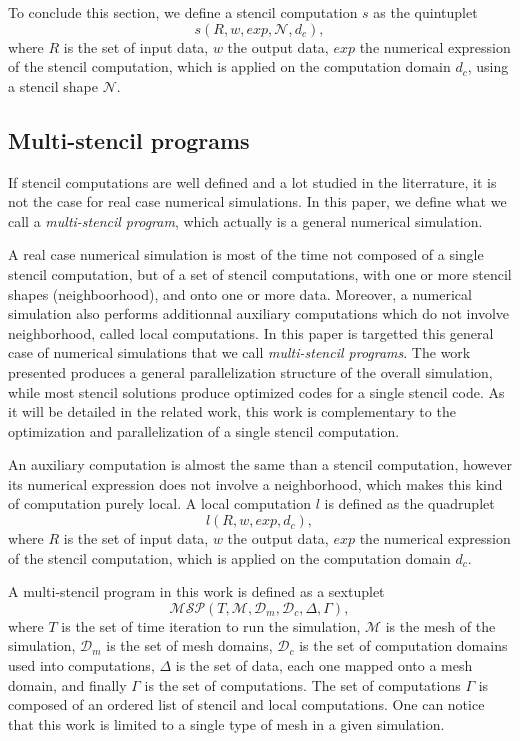 To conclude this section, we define a stencil computation $s$ as the quintuplet
\begin{equation} 
s(R,w,exp,\mathcal{N},d_c),
\label{eq:st}
\end{equation}
where $R$ is the set of input data, $w$ the output data, $exp$ the numerical expression of the stencil computation, which is applied on the computation domain $d_c$, using a stencil shape $\mathcal{N}$.

\subsection{Multi-stencil programs}
\label{sect:multistencil}
If stencil computations are well defined and a lot studied in the literrature, it is not the case for real case numerical simulations. In this paper, we define what we call a \emph{multi-stencil program}, which actually is a general numerical simulation. 

A real case numerical simulation is most of the time not composed of a single stencil computation, but of a set of stencil computations, with one or more stencil shapes (neighboorhood), and onto one or more data. Moreover, a numerical simulation also performs additionnal auxiliary computations which do not involve neighborhood, called local computations. In this paper is targetted this general case of numerical simulations that we call \emph{multi-stencil programs}. The work presented produces a general parallelization structure of the overall simulation, while most stencil solutions produce optimized codes for a single stencil code. As it will be detailed in the related work, this work is complementary to the optimization and parallelization of a single stencil computation.

An auxiliary computation is almost the same than a stencil computation, however its numerical expression does not involve a neighborhood, which makes this kind of computation purely local. A local computation $l$ is defined as the quadruplet
\begin{equation} 
l(R,w,exp,d_c),
\label{eq:loc}
\end{equation}
where $R$ is the set of input data, $w$ the output data, $exp$ the numerical expression of the stencil computation, which is applied on the computation domain $d_c$.

A multi-stencil program in this work is defined as a sextuplet
\begin{equation} 
\mathcal{MSP}(T,\mathcal{M},\mathcal{D}_m,\mathcal{D}_c,\Delta,\Gamma),
\label{eq:msp}
\end{equation}
where $T$ is the set of time iteration to run the simulation, $\mathcal{M}$ is the mesh of the simulation, $\mathcal{D}_m$ is the set of mesh domains, $\mathcal{D}_c$ is the set of computation domains used into computations, $\Delta$ is the set of data, each one mapped onto a mesh domain, and finally $\Gamma$ is the set of computations. The set of computations $\Gamma$ is composed of an ordered list of stencil and local computations. One can notice that this work is limited to a single type of mesh in a given simulation.

